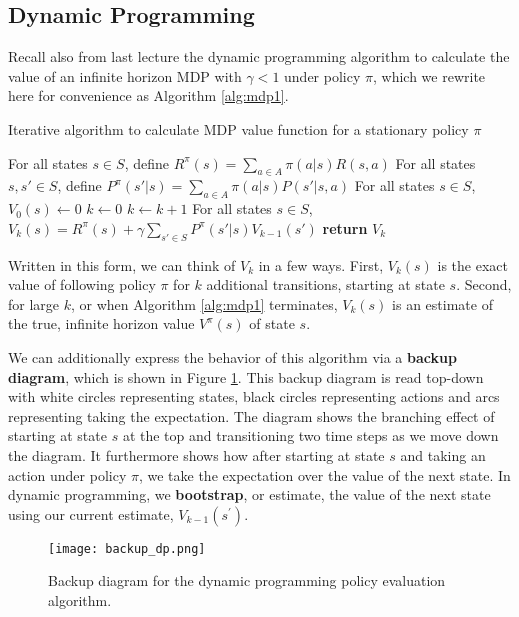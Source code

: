 \documentclass{article}
\begin{document}
\subsection{Dynamic Programming}

Recall also from last lecture the dynamic programming algorithm to calculate the value of an infinite horizon MDP with $\gamma < 1$ under policy $\pi$, which we rewrite here for convenience as Algorithm \ref{alg:mdp1}.

\begin{algorithm}
\caption{Iterative algorithm to calculate MDP value function for a stationary policy $\pi$}\label{alg:mdp1}
\begin{algorithmic}[1]
\State For all states $s \in S$, define $R^{\pi}(s) = \sum_{a \in A} \pi(a|s) R(s,a)$
\State For all states $s,s' \in S$, define $P^{\pi}(s'|s) = \sum_{a \in A} \pi(a|s) P(s'|s,a)$
\State For all states $s \in S$, $V_0(s)\gets 0$
\State $k \gets 0$
\State $k \gets k + 1$
\State For all states $s \in S$, $V_{k}(s) = R^{\pi}(s) + \gamma \sum_{s' \in S} P^{\pi}(s'|s)V_{k-1}(s')$
\EndWhile\label{mdp1label}
\State \textbf{return} $V_{k}$
\EndProcedure
\end{algorithmic}
\end{algorithm}

Written in this form, we can think of $V_k$ in a few ways. First, $V_k(s)$ is the exact value of following policy $\pi$ for $k$ additional transitions, starting at state $s$.  Second, for large $k$, or when Algorithm \ref{alg:mdp1} terminates, $V_k(s)$ is an estimate of the true, infinite horizon value $V^\pi(s)$ of state $s$.

We can additionally express the behavior of this algorithm via a \textbf{backup diagram}, which is shown in Figure \ref{fig:backup-dp}.  This backup diagram is read top-down with white circles representing states, black circles representing actions and arcs representing taking the expectation.  The diagram shows the branching effect of starting at state $s$ at the top and transitioning two time steps as we move down the diagram.  It furthermore shows how after starting at state $s$ and taking an action under policy $\pi$, we take the expectation over the value of the next state.  In dynamic programming, we \textbf{bootstrap}, or estimate, the value of the next state using our current estimate, $V_{k-1}(s^\prime)$.

\begin{figure}
    \centering
    \texttt{[image: backup\_dp.png]}
    \caption{Backup diagram for the dynamic programming policy evaluation algorithm.}\label{fig:backup-dp}
\end{figure}
\end{document}

